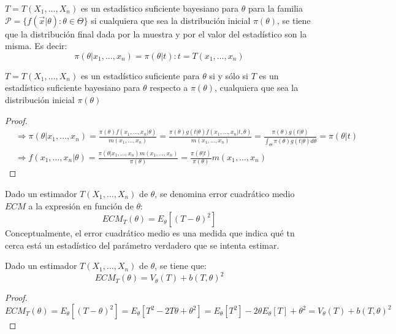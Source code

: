 \begin{definición}
  $T = T(X_1, \ldots, X_n)$ es un estadístico suficiente bayesiano para $\theta$ para la familia $\mathcal{P} = \{f(\vec{x}|\theta) : \theta \in \Theta\}$ si cualquiera que sea la distribución inicial $\pi(\theta)$, se tiene que la distribución final dada por la muestra y por el valor del estadístico son la misma. Es decir: 
  $$\pi(\theta | x_1, \ldots, x_n) = \pi(\theta | t) : t = T(x_1, \ldots, x_n)$$
\end{definición}

\begin{teorema}
    $T = T(X_1, \ldots, X_n)$ es un estadístico suficiente para $\theta$ si y sólo si $T$ es un estadístico suficiente bayesiano para $\theta$ respecto a $\pi(\theta)$, cualquiera que sea la distribución inicial $\pi(\theta)$
\end{teorema}

\begin{proof}
  $$\begin{aligned}
    &\Rightarrow \pi(\theta | x_1, \ldots, x_n) = \frac{\pi(\theta)f(x_1, \ldots, x_n | \theta)}{m(x_1, \ldots, x_n)} = \frac{\pi(\theta)g(t | \theta)f(x_1, \ldots, x_n | t, \theta)}{m(x_1, \ldots, x_n)} = \frac{\pi(\theta)g(t | \theta)}{\int_{\Theta}\pi(\theta)g(t | \theta)d\theta} = \pi(\theta | t)\\
    &\Rightarrow f(x_1, \ldots, x_n | \theta) = \frac{\pi(\theta | x_1, \ldots, x_n)m(x_1, \ldots, x_n)}{\pi(\theta)} = \frac{\pi(\theta | t)}{\pi(\theta)}m(x_1, \ldots, x_n)
  \end{aligned}$$
\end{proof}

\begin{definición}
  Dado un estimador $T(X_1, \ldots, X_n)$ de $\theta$, se denomina error cuadrático medio $ECM$ a la expresión en función de $\theta$:	
  $$ECM_T(\theta) = E_{\theta}[(T - \theta)^2]$$
  Conceptualmente, el error cuadrático medio es una medida que indica qué tn cerca está un estadístico del parámetro verdadero que se intenta estimar. 
\end{definición}

\begin{proposición}
  Dado un estimador $T(X_1, \ldots, X_n)$ de $\theta$, se tiene que:
  $$ECM_T(\theta) = V_{\theta}(T) + b(T, \theta)^2$$
\end{proposición}
\begin{proof}
  $$ECM_T(\theta) = E_{\theta}[(T - \theta)^2] = E_{\theta}[T^2 - 2T\theta + \theta^2] = E_{\theta}[T^2] - 2\theta E_{\theta}[T] + \theta^2 = V_{\theta}(T) + b(T, \theta)^2$$
\end{proof}


